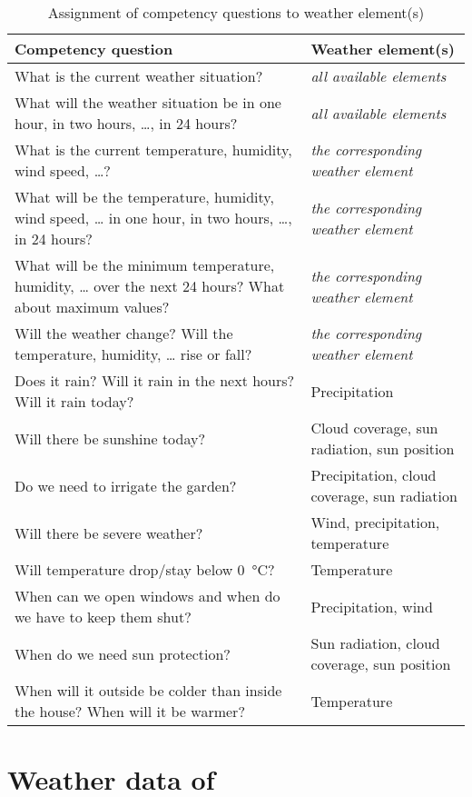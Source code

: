 \begin{table}
\begin{tabularx}{\textwidth}{|X|X|}
\hline
\textbf{Competency question} & \textbf{Weather element(s)} \\
\hline \hline
What is the current weather situation? & \emph{all available elements} \\
\hline
What will the weather situation be in one hour, in two hours, …, in 24 hours? & \emph{all available elements} \\
\hline
What is the current temperature, humidity, wind speed, …? & \emph{the corresponding weather element} \\
\hline
What will be the temperature, humidity, wind speed, … in one hour, in two hours, …, in 24 hours? & \emph{the corresponding weather element} \\
\hline
What will be the minimum temperature, humidity, … over the next 24 hours? What about maximum values? & \emph{the corresponding weather element} \\
\hline
Will the weather change? Will the temperature, humidity, … rise or fall? & \emph{the corresponding weather element} \\
\hline
Does it rain? Will it rain in the next hours? Will it rain today? & Precipitation \\
\hline
Will there be sunshine today? & Cloud coverage, sun radiation, sun position \\
\hline
Do we need to irrigate the garden? & Precipitation, cloud coverage, sun radiation \\
\hline
Will there be severe weather? & Wind, precipitation, temperature \\
\hline
Will temperature drop/stay below \SI{0}{\celsius}? & Temperature \\
\hline
When can we open windows and when do we have to keep them shut? & Precipitation, wind \\
\hline
When do we need sun protection? & Sun radiation, cloud coverage, sun position \\
\hline
When will it outside be colder than inside the house? When will it be warmer? & Temperature \\
\hline
\end{tabularx}
\label{table:competency_questions}
\caption{Assignment of competency questions to weather element(s)}
\end{table}

\section{Weather data  of \yrno}
\label{sec:weather_data_yr_no}

